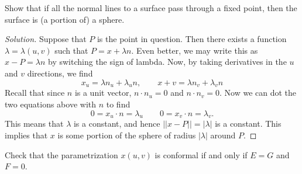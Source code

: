 \documentclass[Shifrin_Solutions_Spring_2018]{subfiles}
\begin{document}
\begin{exercise}
Show that if all the normal lines to a surface pass through a fixed point, then the surface is (a portion of) a sphere.
\end{exercise}

\begin{proof}[Solution] Suppose that $P$ is the point in question. Then there exists a function $\lambda=\lambda(u,v)$ such that $P = x + \lambda n$. Even better, we may write this as $x-P = \lambda n$ by switching the sign of lambda. Now, by taking derivatives in the $u$ and $v$ directions, we find
\[
x_u = \lambda n_u + \lambda_u n, \qquad x+v = \lambda n_v + \lambda_v n
\]
Recall that since $n$ is a unit vector, $n\cdot n_u =0$ and $n\cdot n_v = 0$. Now we can dot the two equations above with $n$ to find
\[
0 = x_u \cdot n = \lambda_u \qquad 0 = x_v \cdot n = \lambda_v.
\]
This means that $\lambda$ is a constant, and hence $||x-P|| = |\lambda|$ is a constant. This implies that $x$ is some portion of the sphere of radius $|\lambda|$ around $P$.
\end{proof}

\begin{exercise}
Check that the parametrization $x(u,v)$ is conformal if and only if $E=G$ and $F=0$.
\end{exercise}
\end{document}
